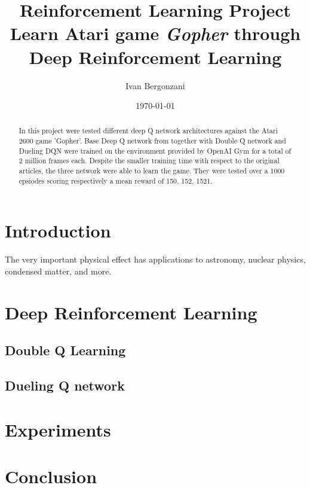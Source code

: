 \documentclass[article,11pt]{article}
\begin{document}
	
	\title{Reinforcement Learning Project\\Learn Atari game \textit{Gopher} through Deep Reinforcement Learning}
	\author{Ivan Bergonzani}
	\date{\today}
	\maketitle
	
	\begin{abstract}
		In this project were tested different deep Q network architectures against the Atari 2600 game 'Gopher'.
		Base Deep Q network from \cite{dqn2013}\cite{dqn2015} together with Double Q network \cite{doubledqn} and Dueling DQN \cite{duelingdqn} were trained on the environment provided by OpenAI Gym for a total of 2 million frames each. Despite the smaller training time with respect to the original articles, the three network were able to learn the game. They were tested over a 1000 epsiodes scoring respectively a mean reward of 150, 152, 1521.
		
	\end{abstract}
	
	
	\section{Introduction}
	
	The very important physical effect has applications to astronomy, nuclear physics, condensed matter, and more. 
	

	\section{Deep Reinforcement Learning}

	\subsection{Double Q Learning}
	
	\subsection{Dueling Q network}
	
	\section{Experiments}
	
	\section{Conclusion}
	
	
	
	
\end{document}

